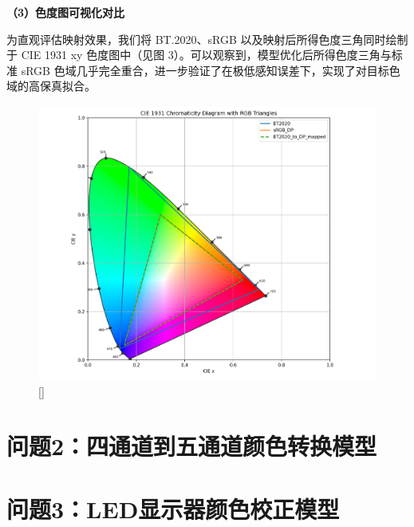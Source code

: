 \noindent\textbf{（3）色度图可视化对比}

为直观评估映射效果，我们将 BT.2020、sRGB 以及映射后所得色度三角同时绘制于 CIE 1931 xy 色度图中（见图 3）。可以观察到，模型优化后所得色度三角与标准 sRGB 色域几乎完全重合，进一步验证了在极低感知误差下，实现了对目标色域的高保真拟合。
\begin{figure}[h]
\centering
{}
\includegraphics[width=0.8\columnwidth]{figures/色度.png}
\bicaption[色度图]{}[]{}
\vspace{-10pt}
\label{figure3: 色度图}
\end{figure}


\section[\hspace{-2pt}问题2：四通道到五通道颜色转换模型]{{\heiti{} \hspace{-8pt}问题2：四通道到五通道颜色转换模型}}\label{section3: 问题2：四通道到五通道颜色转换模型}

\section[\hspace{-2pt}问题3：LED显示器颜色校正模型]{{\heiti{} \hspace{-8pt}问题3：LED显示器颜色校正模型}}\label{section3: 问题3：LED显示器颜色校正模型}